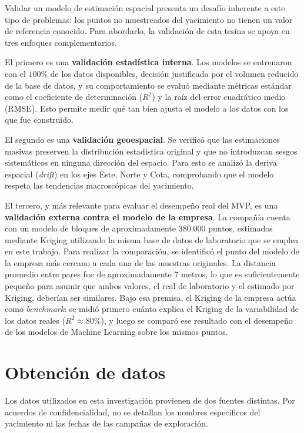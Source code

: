 \documentclass[12pt,letterpaper]{article}
\begin{document}
	Validar un modelo de estimación espacial presenta un desafío inherente a este tipo de problemas: los puntos no muestreados del yacimiento no tienen un valor de referencia conocido. Para abordarlo, la validación de esta tesina se apoya en tres enfoques complementarios.
	
	El primero es una \textbf{validación estadística interna}. Los modelos se entrenaron con el $100\%$ de los datos disponibles, decisión justificada por el volumen reducido de la base de datos, y su comportamiento se evaluó mediante métricas estándar como el coeficiente de determinación ($R^2$) y la raíz del error cuadrático medio (RMSE). Esto permite medir qué tan bien ajusta el modelo a los datos con los que fue construido.
	
	El segundo es una \textbf{validación geoespacial}. Se verificó que las estimaciones masivas preserven la distribución estadística original y que no introduzcan sesgos sistemáticos en ninguna dirección del espacio. Para esto se analizó la deriva espacial (\textit{drift}) en los ejes Este, Norte y Cota, comprobando que el modelo respeta las tendencias macroscópicas del yacimiento.
	
	El tercero, y más relevante para evaluar el desempeño real del MVP, es una 
	\textbf{validación externa contra el modelo de la empresa}. La compañía cuenta con un modelo de bloques de aproximadamente 380.000 puntos, estimados mediante Kriging utilizando la misma base de datos de laboratorio que se emplea en este trabajo. Para realizar la comparación, se identificó el punto del modelo de la empresa más cercano a cada una de las muestras originales. La distancia promedio entre pares fue de aproximadamente 7 metros, lo que es suficientemente pequeño para asumir que ambos valores, el real de laboratorio y el estimado por Kriging, deberían ser similares. Bajo esa premisa, el Kriging de la empresa actúa como \textit{benchmark}: se midió primero cuánto explica el Kriging de la variabilidad de los datos reales ($R^2 \approx 80\%$), y luego se comparó ese resultado con el desempeño de los modelos de Machine Learning sobre los mismos puntos.
	
	\section{Obtención de datos}
	
	Los datos utilizados en esta investigación provienen de dos fuentes distintas. 
	Por acuerdos de confidencialidad, no se detallan los nombres específicos del 
	yacimiento ni las fechas de las campañas de exploración.
	
\end{document}
